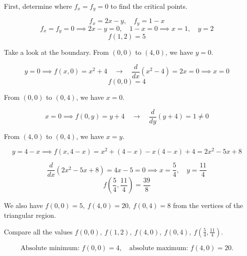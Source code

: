 \documentclass{article}
\begin{document}
\hfill

\noindent First, determine where $f_x=f_y=0$ to find the critical points.

\[f_x=2x-y,\quad f_y=1-x\]
\[f_x=f_y=0\implies2x-y=0,\quad1-x=0\implies x=1,\quad y=2\]
\[f(1,2)=5\]

\hfill

\noindent Take a look at the boundary. From $(0,0)$ to $(4,0)$, we have $y=0$.

\[y=0\implies f(x,0)=x^2+4\quad\rightarrow\quad\frac d{dx}\left(x^2-4\right)=2x=0\implies x=0\]
\[f(0,0)=4\]

\hfill

\noindent From $(0,0)$ to $(0,4)$, we have $x=0$.

\[x=0\implies f(0,y)=y+4\quad\rightarrow\quad\frac d{dy}\left(y+4\right)=1\neq0\]

\hfill

\noindent From $(4,0)$ to $(0,4)$, we have $x=y$.

\[y=4-x\implies f(x,4-x)=x^2+(4-x)-x(4-x)+4=2x^2-5x+8\]

\[\frac d{dx}\left(2x^2-5x+8\right)=4x-5=0\implies x=\frac54,\quad y=\frac{11}4\]
\[f\left(\frac54,\frac{11}4\right)=\frac{39}8\]

\hfill

\noindent We also have $f(0,0)=5,\:f(4,0)=20,\:f(0,4)=8$ from the vertices of the triangular region.

\hfill

\noindent Compare all the values $f(0,0),\:f(1,2),\:f(4,0),\:f(0,4),\:f\left(\frac54,\frac{11}4\right)$.

\[\boxed{\text{Absolute minimum: }f(0,0)=4,\quad \text{absolute maximum: } f(4,0)=20.}\]
\end{document}
